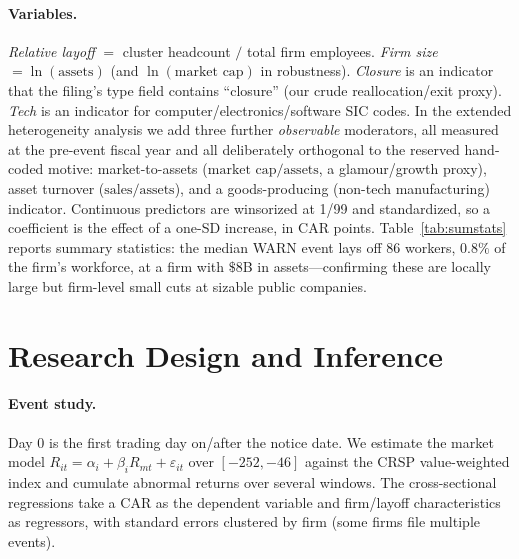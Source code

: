 \documentclass[12pt]{article}
\begin{document}
\paragraph{Variables.} \emph{Relative layoff} $=$ cluster headcount $/$ total
firm employees. \emph{Firm size} $=\ln(\text{assets})$ (and $\ln(\text{market
cap})$ in robustness). \emph{Closure} is an indicator that the filing's type
field contains ``closure'' (our crude reallocation/exit proxy). \emph{Tech} is an
indicator for computer/electronics/software SIC codes. In the extended
heterogeneity analysis we add three further \emph{observable} moderators, all
measured at the pre-event fiscal year and all deliberately orthogonal to the
reserved hand-coded motive: market-to-assets ($\text{market cap}/\text{assets}$, a
glamour/growth proxy), asset turnover ($\text{sales}/\text{assets}$), and a
goods-producing (non-tech manufacturing) indicator. Continuous predictors are
winsorized at 1/99 and standardized, so a coefficient is the effect of a one-SD
increase, in CAR points. Table~\ref{tab:sumstats} reports summary statistics: the
median WARN event lays off 86 workers, $0.8\%$ of the firm's workforce, at a firm
with $\$8$B in assets---confirming these are locally large but firm-level small
cuts at sizable public companies.

\section{Research Design and Inference}\label{sec:design}
\paragraph{Event study.} Day 0 is the first trading day on/after the notice date.
We estimate the market model $R_{it}=\alpha_i+\beta_i R_{mt}+\varepsilon_{it}$ over
$[-252,-46]$ against the CRSP value-weighted index and cumulate abnormal returns
over several windows. The cross-sectional regressions take a CAR as the dependent
variable and firm/layoff characteristics as regressors, with standard errors
clustered by firm (some firms file multiple events).
\end{document}
